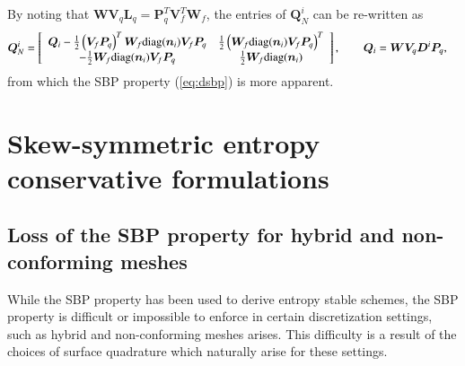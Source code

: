 \documentclass[preprint,10pt]{elsarticle}
\theoremstyle{definition}
\theoremstyle{lemma}
\newtheorem{lemma}{Lemma}
\theoremstyle{corollary}
\theoremstyle{theorem}
\theoremstyle{assumption}
\renewcommand{\hat}[1]{\widehat{#1}}
\newcommand{\LRp}[1]{\left( #1 \right)}
\newcommand{\LRs}[1]{\left[ #1 \right]}
\newcommand{\diag}[1]{{\rm diag}\LRp{#1}}
\begin{document}
By noting that $\bm{W}\bm{V}_q \bm{L}_q = \bm{P}_q^T\bm{V}_f^T\bm{W}_f$, the entries of $\bm{Q}^i_N$ can be re-written as
\begin{align}
\bm{Q}^i_N  &= \LRs{
\begin{array}{cc}
\bm{Q}_i - \frac{1}{2}\LRp{\bm{V}_f \bm{P}_q}^T  \bm{W}_f{\rm diag}({\bm{n}}_i) \bm{V}_f\bm{P}_q &  \frac{1}{2}\LRp{\bm{W}_f{\rm diag}({\bm{n}}_i)\bm{V}_f\bm{P}_q}^T\\
-\frac{1}{2}\bm{W}_f{\rm diag}({\bm{n}}_i)\bm{V}_f\bm{P}_q & \frac{1}{2}\bm{W}_f{\rm diag}({\bm{n}}_i)
\end{array}}, \qquad \bm{Q}_i = \bm{W}\bm{V}_q\bm{D}^i\bm{P}_q,
\label{eq:QN}
\end{align}
from which the SBP property (\ref{eq:dsbp}) is more apparent.  



\section{Skew-symmetric entropy conservative formulations}

\subsection{Loss of the SBP property for hybrid and non-conforming meshes}
While the SBP property has been used to derive entropy stable schemes, the SBP property is difficult or impossible to enforce in certain discretization settings, such as hybrid and non-conforming meshes arises.  This difficulty is a result of the choices of surface quadrature which naturally arise for these settings.  
\end{document}
